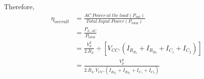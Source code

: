 \documentclass[a4paper,11pt]{article}%
\begin{document}
Therefore, 
\[
\begin{split}
\eta_{overall} &=\frac{AC~Power~at~the~load(P_{out})}{Total~ Input~Power(P_{total})}\\ 
&= \frac{P_{L,AC}}{P_{total}}\\
&= \frac{V_p^2}{2.R_L} \div  \left[ V_{CC}. \left(  I_{R_{B_1}}+  I_{R_{B_3}}+ I_{C_1}+ I_{C_2}\right) \right] \\
& = \frac{V_p^2}{2.R_L.V_{CC}. \left(  I_{R_{B_1}}+  I_{R_{B_3}}+ I_{C_1}+ I_{C_2}\right)}
\end{split}
\]
\end{document}
